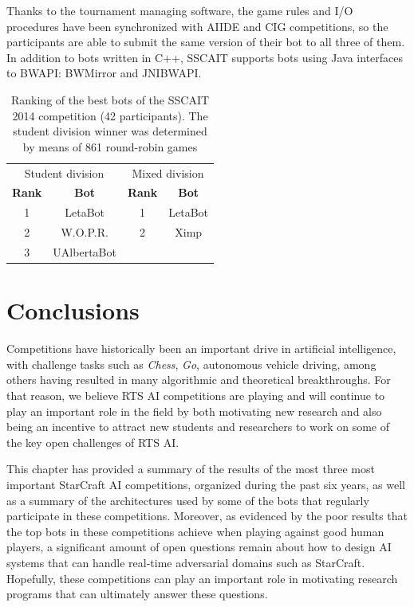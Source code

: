 \documentclass{llncs}
\begin{document}
Thanks to the tournament managing software, the game rules and I/O procedures have been synchronized with AIIDE and CIG competitions, so the participants are able to submit the same version of their bot to all three of them. In addition to bots written in C++, SSCAIT supports bots using Java interfaces to BWAPI: BWMirror and JNIBWAPI. 

\begin{table}[!t]
\caption{Ranking of the best bots of the SSCAIT 2014 competition (42 participants).
The student division winner was determined by means of 861 round-robin games}
\label{tab:sscait2014}
\centering
\begin{tabular}{|c|c|c|c|}
\hline
\multicolumn{2}{|c|}{Student division} & \multicolumn{2}{|c|}{Mixed division}\\
{\bfseries Rank} & {\bfseries Bot} & {\bfseries Rank} & {\bfseries Bot} \\
\hline
1 & LetaBot & 1 & LetaBot \\
2 & W.O.P.R.  & 2 & Ximp \\
3 & UAlbertaBot 			&   &  \\
\hline
\end{tabular}
\end{table}


\section{Conclusions}

Competitions have historically been an important drive in artificial intelligence, with challenge tasks such as {\em Chess}, {\em Go}, autonomous vehicle driving, among others having resulted in many algorithmic and theoretical breakthroughs. For that reason, we believe RTS AI competitions are playing and will continue to play an important role in the field by both motivating new research and also being an incentive to attract new students and researchers to work on some of the key open challenges of RTS AI.

This chapter has provided a summary of the results of the most three most important StarCraft AI competitions, organized during the past six years, as well as a summary of the architectures used by some of the bots that regularly participate in these competitions. Moreover, as evidenced by the poor results that the top bots in these competitions achieve when playing against good human players, a significant amount of open questions remain about how to design AI systems that can handle real-time adversarial domains such as StarCraft. Hopefully, these competitions can play an important role in motivating research programs that can ultimately answer these questions.
\end{document}
